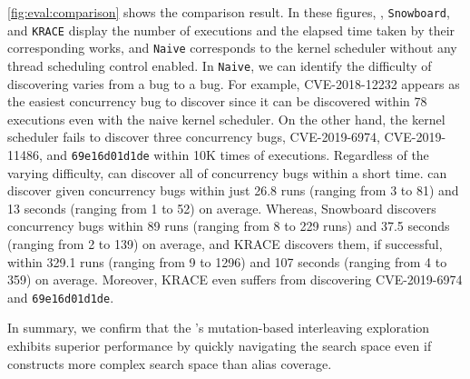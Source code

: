 


%
\autoref{fig:eval:comparison} shows the comparison result.
%
In these figures, \texttt{\sys}, \texttt{Snowboard}, and
\texttt{KRACE} display the number of executions and the elapsed time
taken by their corresponding works, and \texttt{Naive} corresponds to
the kernel scheduler without any thread scheduling control enabled.
%
%
In \texttt{Naive}, we can identify the difficulty of discovering
varies from a bug to a bug.
%
For example, CVE-2018-12232 appears as the easiest concurrency bug to
discover since it can be discovered within 78 executions even with the naive kernel scheduler.
%
On the other hand, the kernel scheduler fails to discover three
concurrency bugs, CVE-2019-6974, CVE-2019-11486, and
\texttt{69e16d01d1de} within 10K times of executions.
%
Regardless of the varying difficulty, \sys can discover all of
concurrency bugs within a short time.
%
\sys can discover given concurrency bugs within just 26.8 runs
(ranging from 3 to 81) and 13 seconds (ranging from 1 to 52) on
average.
%
Whereas, Snowboard discovers concurrency bugs within 89 runs (ranging
from 8 to 229 runs) and 37.5 seconds (ranging from 2 to 139) on
average, and KRACE discovers them, if successful, within 329.1 runs
(ranging from 9 to 1296) and 107 seconds (ranging from 4 to 359) on
average.  Moreover, KRACE even suffers from discovering CVE-2019-6974
and \texttt{69e16d01d1de}.

In summary, we confirm that the \sys's mutation-based interleaving
exploration exhibits superior performance by quickly navigating the
search space even if \intcov constructs more complex search space than
alias coverage.

